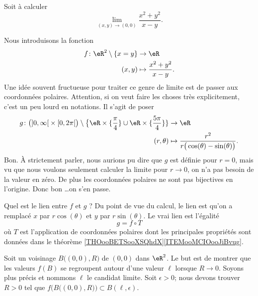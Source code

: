 \begin{example}     \label{EXooSDHDooJzDioW}
	Soit à calculer
	\begin{equation}
		\lim_{(x,y)\to(0,0)}\frac{ x^2+y^2 }{ x-y }.
	\end{equation}

	Nous introduisons la fonction
	\begin{equation}
		\begin{aligned}
			f\colon \eR^2\setminus\{ x=y \} & \to \eR                          \\
			(x,y)                           & \mapsto \frac{ x^2+y^2 }{ x-y }.
		\end{aligned}
	\end{equation}
	Une idée souvent fructueuse pour traiter ce genre de limite est de passer aux coordonnées polaires. Attention, si on veut faire les choses très explicitement, c'est un peu lourd en notations. Il s'agit de poser
	\begin{equation}
		\begin{aligned}
			g\colon \big( \mathopen] 0 , \infty \mathclose[\times\mathopen[ 0 , 2\pi \mathclose[ \big)\setminus\big\{ \eR\times\{ \frac{ \pi }{ 4 }\}\cup\eR\times \{ \frac{ 5\pi }{ 4 } \} \} & \to \eR                                                         \\
			(r,\theta)                                                                                                                                                                         & \mapsto \frac{ r^2 }{ r\big( \cos(\theta)-\sin(\theta) \big) }.
		\end{aligned}
	\end{equation}
	Bon. À strictement parler, nous aurions pu dire que \( g\) est définie pour \( r=0\), mais vu que nous voulons seulement calculer la limite pour \( r\to 0\), on n'a pas besoin de la valeur en zéro. De plus les coordonnées polaires ne sont pas bijectives en l'origine. Donc bon \ldots on s'en passe.

	Quel est le lien entre \( f\) et \( g \) ? Du point de vue du calcul, le lien est qu'on a remplacé \( x\) par \( r\cos(\theta)\) et \( y\) par \( r\sin(\theta)\). Le vrai lien est l'égalité
	\begin{equation}
		g=f\circ T
	\end{equation}
	où \( T\) est l'application de coordonnées polaires dont les principales propriétés sont données dans le théorème \ref{THOooBETSooXSQhdX}\ref{ITEMooMCIOooJiBvug}.

	Soit un voisinage \( B\big( (0,0), R \big)\) de \( (0,0)\) dans \( \eR^2\). Le but est de montrer que les valeurs \( f(B)\) se regroupent autour d'une valeur \( \ell\) lorsque \( R\to 0\). Soyons plus précis et nommons \( \ell\) le candidat limite. Soit \( \epsilon>0\); nous devons trouver \( R>0\) tel que \( f\Big( B\big( (0,0),R \big) \Big)\subset B(\ell,\epsilon)\).


\end{example}
